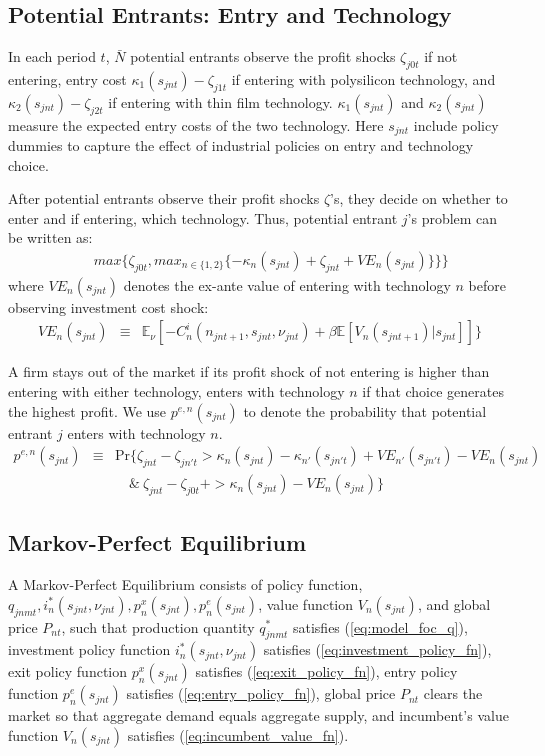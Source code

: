\documentclass[12pt]{article}
\begin{document}
\subsection{Potential Entrants: Entry and Technology}
In each period $t$, $\bar N$ potential entrants observe the profit shocks $\zeta_{j0t}$ if not entering, entry cost $\kappa_1(s_{jnt})-\zeta_{j1t}$ if entering with polysilicon technology, and $\kappa_2(s_{jnt})-\zeta_{j2t}$ if entering with thin film technology. $\kappa_1(s_{jnt})$ and $\kappa_2(s_{jnt})$ measure the expected entry costs of the two technology. Here $s_{jnt}$ include policy dummies to capture the effect of industrial policies on entry and technology choice.

After potential entrants observe their profit shocks $\zeta$'s, they decide on whether to enter and if entering, which technology. Thus, potential entrant $j$'s problem can be written as:
\begin{eqnarray}
 && max\{\zeta_{j0t}, max_{n\in \{1,2\}} \{-\kappa_n(s_{jnt}) + \zeta_{jnt} + VE_n(s_{jnt})\}\} \}
\end{eqnarray}
where $VE_n(s_{jnt})$ denotes the ex-ante value of entering with technology $n$ before observing investment cost shock:
\begin{eqnarray}
  VE_n(s_{jnt}) & \equiv & \mathbb{E}_{\nu}[-C_n^i(n_{jnt+1},s_{jnt},\nu_{jnt})+\beta \mathbb{E}[V_n(s_{jnt+1})|s_{jnt}]]\} \nonumber
\end{eqnarray}

A firm stays out of the market if its profit shock of not entering is higher than entering with either technology, enters with technology $n$ if that choice generates the highest profit. We use $p^{e,n}(s_{jnt})$ to denote the probability that potential entrant $j$ enters with technology $n$.
\begin{eqnarray}
  p^{e,n}(s_{jnt}) & \equiv & \text{Pr}\{\zeta_{jnt} - \zeta_{jn't}  > \kappa_n(s_{jnt})-\kappa_{n'}(s_{jn't}) + VE_{n'}(s_{jn't}) - VE_n(s_{jnt}) \nonumber \\
  & & \quad  \& \  \zeta_{jnt}-\zeta_{j0t} + >\kappa_n(s_{jnt})-VE_n(s_{jnt}) \} \label{eq:entry_policy_fn}
\end{eqnarray}



\subsection{Markov-Perfect Equilibrium}
A Markov-Perfect Equilibrium consists of policy function, $q_{jnmt},i^*_n(s_{jnt},\nu_{jnt}), p_n^x(s_{jnt}), p_n^e(s_{jnt})$, value function $V_n(s_{jnt})$, and global price $P_{nt}$, such that production quantity $q_{jnmt}^*$ satisfies (\ref{eq:model_foc_q}), investment policy function $i_n^*(s_{jnt},\nu_{jnt})$ satisfies (\ref{eq:investment_policy_fn}), exit policy function $p_n^x(s_{jnt})$ satisfies (\ref{eq:exit_policy_fn}), entry policy function $p_n^e(s_{jnt})$ satisfies (\ref{eq:entry_policy_fn}), global price $P_{nt}$ clears the market so that aggregate demand equals aggregate supply, and
incumbent's value function $V_n(s_{jnt})$ satisfies (\ref{eq:incumbent_value_fn}).
\end{document}
